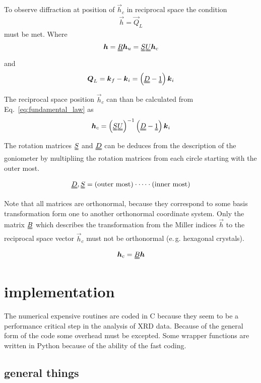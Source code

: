 To observe diffraction at position of $\vec h_c$ in reciprocal space the condition
\begin{align}
 \vec h = \vec Q_L
\label{eq:fundamental_law}
\end{align}
must be met. Where
\begin{align}
 \vec h = \mat R \vec h_u = \mat S \mat U \vec h_c
\end{align}
and
\begin{align}
 \vec Q_L = \vec k_f - \vec k_i = \left( \mat D - \mat 1 \right) \vec k_i
\end{align}

The reciprocal space position $\vec h_c$ can than be calculated from Eq.~\ref{eq:fundamental_law} as
\begin{align}
 \vec h_c = \left( \mat S \mat U \right)^{-1} \left(\mat D - \mat 1 \right) \vec k_i
 \label{eq:momentum_space_conversion}
\end{align}

The rotation matrices $\mat S$ and $\mat D$ can be deduces from the description of the goniometer by multipliing the rotation matrices from each circle starting with the outer most.

\begin{align}
 \mat D, \mat S = \text{(outer most)} \cdot \dots \cdot \text{(inner most)}
\end{align}

Note that all matrices are orthonormal, because they correspond to some basis transformation form one to another orthonormal coordinate system. Only the matrix $\mat B$ which describes the transformation from the Miller indices $\vec h$ to the reciprocal space vector $\vec h_c$ must not be orthonormal (e.\,g. hexagonal crystals).

\begin{align}
 \vec h_c = \mat B \vec h
\end{align}

\section{implementation}

The numerical expensive routines are coded in C because they seem to be a performance critical step in the analysis of XRD data. Because of the general form of the code some overhead must be excepted. Some wrapper functions are written in Python because of the ability of the fast coding.

\subsection*{general things}

